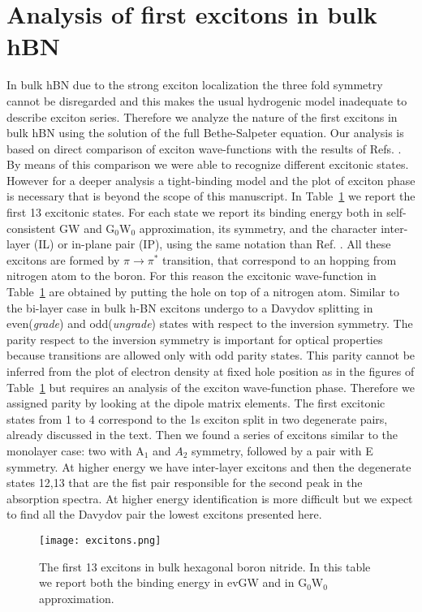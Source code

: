 \section{Analysis of first excitons in bulk hBN} \label{app:exc}
%
In bulk hBN due to the strong exciton localization the three fold symmetry cannot be disregarded and this makes the usual hydrogenic model inadequate to describe exciton series.\cite{attaccalite2018two}
Therefore we analyze the nature of the first excitons in bulk hBN using the solution of the full Bethe-Salpeter equation. Our analysis is based on direct comparison of exciton wave-functions with the results of Refs. \cite{paleari2018excitons,galvani2016excitons,attaccalite2018two}. By means of this comparison we were able  to recognize different excitonic states. However for a deeper analysis a tight-binding model and the plot of exciton phase is necessary \cite{galvani2016excitons} that is beyond the scope of this manuscript. In Table~\ref{exc_table} we report the first 13 excitonic states. For each state we report its binding energy both in self-consistent GW and G$_0$W$_0$ approximation, its symmetry, and the character inter-layer (IL) or in-plane pair (IP), using the same notation than  Ref. \cite{galvani2016excitons}. All these excitons are formed by $\pi \rightarrow \pi^*$ transition, that correspond to an hopping from nitrogen atom to the boron. For this reason the excitonic wave-function in Table~\ref{exc_table} are obtained by putting the hole on top of a nitrogen atom. Similar to the bi-layer case\cite{galvani2016excitons} in bulk h-BN excitons undergo to a Davydov splitting in even(\emph{grade}) and odd(\emph{ungrade}) states with respect to the inversion symmetry. The parity respect to the inversion symmetry is important for optical properties because transitions are allowed only with odd parity states.\cite{attaccalite2018two} This parity cannot be inferred from the plot of electron density at fixed hole position as in the figures of Table~\ref{exc_table} but requires an analysis of the exciton wave-function phase. Therefore we assigned parity by looking at the dipole matrix elements.
The first excitonic states from 1 to 4 correspond to the 1s exciton split in two degenerate pairs, already discussed in the text. Then we found a series of excitons similar to the monolayer case\cite{paleari2018excitons}: two with A$_1$ and $A_2$ symmetry, followed by a pair with E symmetry. At higher energy we have inter-layer excitons and then the degenerate states 12,13 that are the fist pair responsible for the second peak in the absorption spectra. At higher energy identification is more difficult but we expect to find all the Davydov pair the lowest excitons presented here.	
\begin{figure}[t]
\centering
\texttt{[image: excitons.png]}
    \caption{\footnotesize{The first 13 excitons in bulk hexagonal boron nitride. In this table we report both the binding energy in evGW and in G$_0$W$_0$ approximation.\label{exc_table}}}
\end{figure}